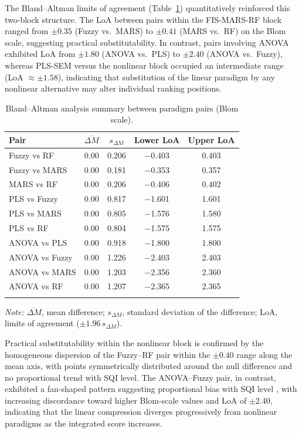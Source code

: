 \documentclass[pdflatex,sn-basic]{sn-jnl}%
\begin{document}
The Bland--Altman limits of agreement \citep{BlandAltman1986} (Table~\ref{tab:blandaltman}) quantitatively reinforced this two-block structure. The LoA between pairs within the FIS-MARS-RF block ranged from $\pm 0.35$ (Fuzzy vs.\ MARS) to $\pm 0.41$ (MARS vs.\ RF) on the Blom scale, suggesting practical substitutability. In contrast, pairs involving ANOVA exhibited LoA from $\pm 1.80$ (ANOVA vs.\ PLS) to $\pm 2.40$ (ANOVA vs.\ Fuzzy), whereas PLS-SEM versus the nonlinear block occupied an intermediate range (LoA $\approx \pm 1.58$), indicating that substitution of the linear paradigm by any nonlinear alternative may alter individual ranking positions.

\begin{table}[ht]
\caption{Bland--Altman analysis summary between paradigm pairs (Blom scale).}\label{tab:blandaltman}
\begin{tabular*}{\textwidth}{@{\extracolsep\fill}lcccc}
\toprule
Pair & $\overline{\Delta M}$ & $s_{\Delta M}$ & Lower LoA & Upper LoA \\
\midrule
Fuzzy vs RF    & 0.00 & 0.206 & $-$0.403 & 0.403 \\
Fuzzy vs MARS  & 0.00 & 0.181 & $-$0.353 & 0.357 \\
MARS vs RF     & 0.00 & 0.206 & $-$0.406 & 0.402 \\
PLS vs Fuzzy   & 0.00 & 0.817 & $-$1.601 & 1.601 \\
PLS vs MARS    & 0.00 & 0.805 & $-$1.576 & 1.580 \\
PLS vs RF      & 0.00 & 0.804 & $-$1.575 & 1.575 \\
ANOVA vs PLS   & 0.00 & 0.918 & $-$1.800 & 1.800 \\
ANOVA vs Fuzzy & 0.00 & 1.226 & $-$2.403 & 2.403 \\
ANOVA vs MARS  & 0.00 & 1.203 & $-$2.356 & 2.360 \\
ANOVA vs RF    & 0.00 & 1.207 & $-$2.365 & 2.365 \\
\botrule
\end{tabular*}
\smallskip\noindent\textit{Note:} $\overline{\Delta M}$, mean difference; $s_{\Delta M}$, standard deviation of the difference; LoA, limits of agreement ($\pm 1.96\,s_{\Delta M}$).
\end{table}

\clearpage

Practical substitutability within the nonlinear block is confirmed by the homogeneous dispersion of the Fuzzy--RF pair within the $\pm 0.40$ range along the mean axis, with points symmetrically distributed around the null difference and no proportional trend with SQI level. The ANOVA--Fuzzy pair, in contrast, exhibited a fan-shaped pattern suggesting proportional bias with SQI level \citep{Giavarina2015}, with increasing discordance toward higher Blom-scale values and LoA of $\pm 2.40$, indicating that the linear compression diverges progressively from nonlinear paradigms as the integrated score increases.
\end{document}
